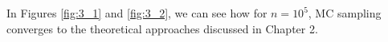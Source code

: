 In Figures \ref{fig:3_1} and \ref{fig:3_2}, we can see how for $n=10^5$, MC sampling converges to the theoretical approaches discussed in Chapter 2.
% 
% 
% 
% 
% 

% 
% 
% 
% 
% 
% 
% 
% 
% 
% 
% 
% 
% 
% 
% 
% 
% 
% 



